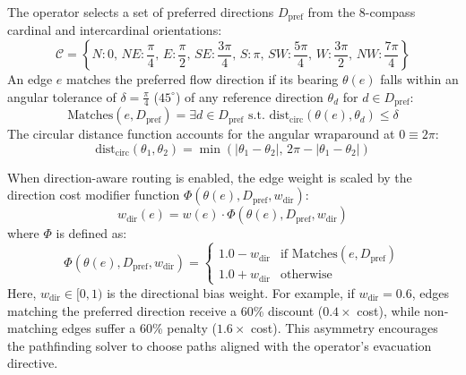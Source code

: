 \documentclass[12pt,a4paper,oneside]{report}
\begin{document}
The operator selects a set of preferred directions $D_{\text{pref}}$ from the 8-compass cardinal and intercardinal orientations:
\begin{equation}
\mathcal{C} = \left\{ N: 0, \, NE: \frac{\pi}{4}, \, E: \frac{\pi}{2}, \, SE: \frac{3\pi}{4}, \, S: \pi, \, SW: \frac{5\pi}{4}, \, W: \frac{3\pi}{2}, \, NW: \frac{7\pi}{4} \right\}
\end{equation}
An edge $e$ matches the preferred flow direction if its bearing $\theta(e)$ falls within an angular tolerance of $\delta = \frac{\pi}{4}$ ($45^\circ$) of any reference direction $\theta_d$ for $d \in D_{\text{pref}}$:
\begin{equation}
\text{Matches}(e, D_{\text{pref}}) = \exists d \in D_{\text{pref}} \text{ s.t. } \text{dist}_{\text{circ}}(\theta(e), \theta_d) \le \delta
\label{eq:direction_match}
\end{equation}
The circular distance function accounts for the angular wraparound at $0 \equiv 2\pi$:
\begin{equation}
\text{dist}_{\text{circ}}(\theta_1, \theta_2) = \min\left(|\theta_1 - \theta_2|, \, 2\pi - |\theta_1 - \theta_2|\right)
\label{eq:circular_dist}
\end{equation}

When direction-aware routing is enabled, the edge weight is scaled by the direction cost modifier function $\Phi(\theta(e), D_{\text{pref}}, w_{\text{dir}})$:
\begin{equation}
w_{\text{dir}}(e) = w(e) \cdot \Phi(\theta(e), D_{\text{pref}}, w_{\text{dir}})
\label{eq:direction_cost_scaling}
\end{equation}
where $\Phi$ is defined as:
\begin{equation}
\Phi(\theta(e), D_{\text{pref}}, w_{\text{dir}}) = \begin{cases} 
1.0 - w_{\text{dir}} & \text{if } \text{Matches}(e, D_{\text{pref}}) \\ 
1.0 + w_{\text{dir}} & \text{otherwise} 
\end{cases}
\label{eq:modifier_function}
\end{equation}
Here, $w_{\text{dir}} \in [0, 1)$ is the directional bias weight. For example, if $w_{\text{dir}} = 0.6$, edges matching the preferred direction receive a 60\% discount ($0.4\times$ cost), while non-matching edges suffer a 60\% penalty ($1.6\times$ cost). This asymmetry encourages the pathfinding solver to choose paths aligned with the operator's evacuation directive.

\end{document}

